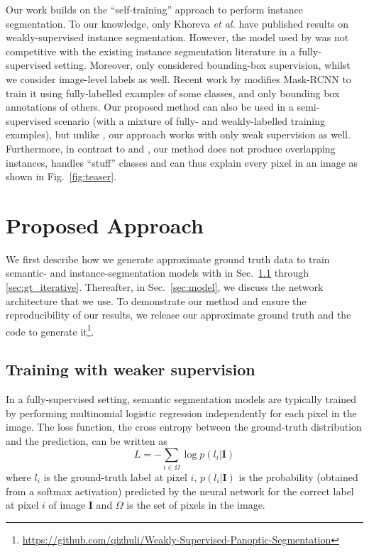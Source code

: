 \documentclass[runningheads]{llncs}
\def\etal{\emph{et al.} }
\begin{document}
Our work builds on the ``self-training'' approach to perform instance segmentation.
To our knowledge, only Khoreva \etal \cite{khoreva_cvpr_2017} have published results on weakly-supervised instance segmentation.
However, the model used by \cite{khoreva_cvpr_2017} was not competitive with the existing instance segmentation literature in a fully-supervised setting.
Moreover, \cite{khoreva_cvpr_2017} only considered bounding-box supervision, whilst we consider image-level labels as well.
Recent work by \cite{hu_arxiv_2017} modifies Mask-RCNN \cite{he_iccv_2017} to train it using fully-labelled examples of some classes, and only bounding box annotations of others.
Our proposed method can also be used in a semi-supervised scenario (with a mixture of fully- and weakly-labelled training examples), but unlike \cite{hu_arxiv_2017}, our approach works with only weak supervision as well.
Furthermore, in contrast to \cite{khoreva_cvpr_2017} and \cite{hu_arxiv_2017}, our method does not produce overlapping instances, handles ``stuff'' classes and can thus explain every pixel in an image as shown in Fig.~\ref{fig:teaser}.
 \section{Proposed Approach}

We first describe how we generate approximate ground truth data to train semantic- and instance-segmentation models with in Sec.~\ref{sec:gt_intro} through \ref{sec:gt_iterative}.
Thereafter, in Sec.~\ref{sec:model}, we discuss the network architecture that we use.
To demonstrate our method and ensure the reproducibility of our results, we release our approximate ground truth and the code to generate it\footnote{\scriptsize{\url{ https://github.com/qizhuli/Weakly-Supervised-Panoptic-Segmentation}}}.

\subsection{Training with weaker supervision}
\label{sec:gt_intro}
In a fully-supervised setting, semantic segmentation models are typically trained by performing multinomial logistic regression independently for each pixel in the image.
The loss function, the cross entropy between the ground-truth distribution and the prediction, can be written as 
\begin{equation}
L = -\sum_{i \in \Omega}{\log{p(l_i | \mathbf{I})}}
\end{equation}
where $l_i$ is the ground-truth label at pixel $i$, $p(l_i | \mathbf{I})$ is the probability (obtained from a softmax activation) predicted by the neural network for the correct label at pixel $i$ of image $\mathbf{I}$ and $\Omega$ is the set of pixels in the image.
\end{document}
